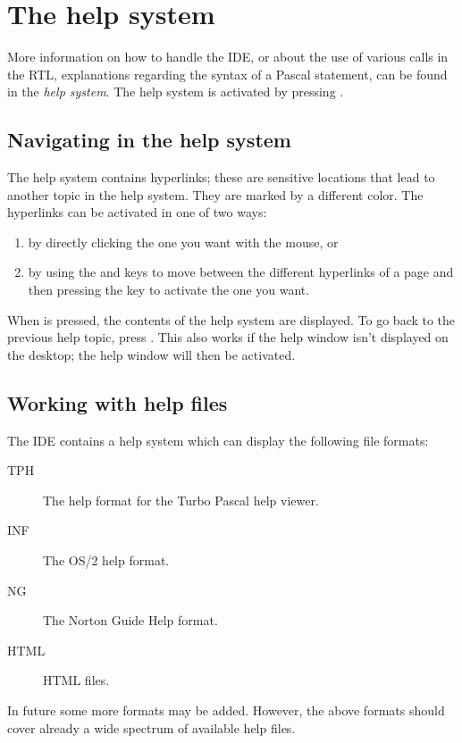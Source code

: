 \section{The help system}

More information on how to handle the IDE, or about the use of various
calls in the RTL, explanations regarding the syntax of a Pascal statement,
can be found in the \emph{help system}. The help system is activated
by pressing .

\subsection{Navigating in the help system}
The help system contains hyperlinks; these are sensitive locations that
lead to another topic in the help system. They are marked by a different
color. The hyperlinks can be activated in one of two ways:
\begin{enumerate}
\item by directly clicking the one you want with the mouse, or
\item by using the  and  keys to move between
the different hyperlinks of a page and then pressing the  
key to activate the one you want.
\end{enumerate}

When  is pressed, the contents of the help system are
displayed. To go back to the previous help topic, press .
This also works if the help window isn't displayed on the desktop; the help
window will then be activated.

%
%
\subsection{Working with help files}
The IDE contains a help system which can display the following file formats:
\begin{description}
\item[TPH] The help format for the Turbo Pascal help viewer.
\item[INF] The OS/2 help format.
\item[NG] The Norton Guide Help format.
\item[HTML] HTML files.
\end{description}
In future some more formats may be added. However, the above formats should
cover already a wide spectrum of available help files.

